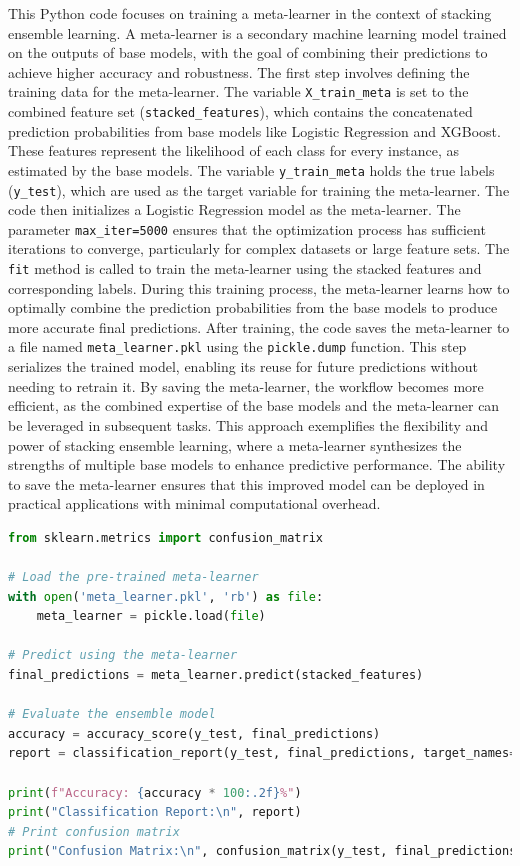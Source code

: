 \noindent
This Python code focuses on training a meta-learner in the context of stacking ensemble learning. A meta-learner is a secondary machine learning model trained on the outputs of base models, with the goal of combining their predictions to achieve higher accuracy and robustness. The first step involves defining the training data for the meta-learner. The variable \texttt{X\_train\_meta} is set to the combined feature set (\texttt{stacked\_features}), which contains the concatenated prediction probabilities from base models like Logistic Regression and XGBoost. These features represent the likelihood of each class for every instance, as estimated by the base models. The variable \texttt{y\_train\_meta} holds the true labels (\texttt{y\_test}), which are used as the target variable for training the meta-learner. The code then initializes a Logistic Regression model as the meta-learner. The parameter \texttt{max\_iter=5000} ensures that the optimization process has sufficient iterations to converge, particularly for complex datasets or large feature sets. The \texttt{fit} method is called to train the meta-learner using the stacked features and corresponding labels. During this training process, the meta-learner learns how to optimally combine the prediction probabilities from the base models to produce more accurate final predictions. After training, the code saves the meta-learner to a file named \texttt{meta\_learner.pkl} using the \texttt{pickle.dump} function. This step serializes the trained model, enabling its reuse for future predictions without needing to retrain it. By saving the meta-learner, the workflow becomes more efficient, as the combined expertise of the base models and the meta-learner can be leveraged in subsequent tasks. This approach exemplifies the flexibility and power of stacking ensemble learning, where a meta-learner synthesizes the strengths of multiple base models to enhance predictive performance. The ability to save the meta-learner ensures that this improved model can be deployed in practical applications with minimal computational overhead.
    

\begin{tcolorbox}[colback=gray!5!white, colframe=gray!80!black, boxrule=0.5pt, title=Evaluate Meta-Learner and Ensemble Model]
\begin{lstlisting}[language=Python]
from sklearn.metrics import confusion_matrix

# Load the pre-trained meta-learner
with open('meta_learner.pkl', 'rb') as file:
    meta_learner = pickle.load(file)

# Predict using the meta-learner
final_predictions = meta_learner.predict(stacked_features)

# Evaluate the ensemble model
accuracy = accuracy_score(y_test, final_predictions)
report = classification_report(y_test, final_predictions, target_names=label_encoder.classes_)

print(f"Accuracy: {accuracy * 100:.2f}%")
print("Classification Report:\n", report)
# Print confusion matrix
print("Confusion Matrix:\n", confusion_matrix(y_test, final_predictions))
\end{lstlisting}
\end{tcolorbox}

